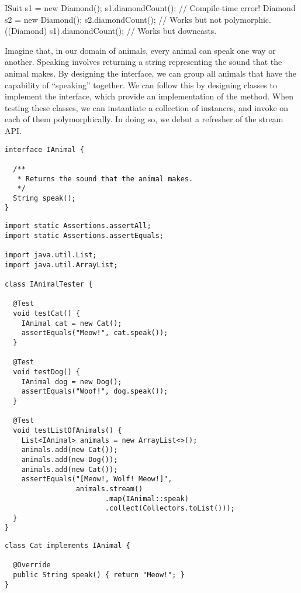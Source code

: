 \begin{verbnobox}[\small]
ISuit s1 = new Diamond();
s1.diamondCount();             // Compile-time error!
Diamond s2 = new Diamond();
s2.diamondCount();             // Works but not polymorphic.
((Diamond) s1).diamondCount(); // Works but downcasts.
\end{verbnobox}

Imagine that, in our domain of animals, every animal can speak one way or another. 
Speaking involves returning a string representing the sound that the animal makes. 
By designing the  interface, we can group all animals that have the capability of ``speaking'' together. 
We can follow this by designing classes to implement the  interface, which provide an implementation of the  method. 
When testing these classes, we can instantiate a collection of  instances, and invoke  on each of them polymorphically. 
In doing so, we debut a refresher of the stream API.

\enlargethispage{-4\baselineskip}
\begin{lstlisting}[language=MyJava]
interface IAnimal {

  /**
   * Returns the sound that the animal makes.
   */
  String speak();
}
\end{lstlisting}

\begin{lstlisting}[language=MyJava]
import static Assertions.assertAll;
import static Assertions.assertEquals;

import java.util.List;
import java.util.ArrayList;

class IAnimalTester {
  
  @Test
  void testCat() {
    IAnimal cat = new Cat();
    assertEquals("Meow!", cat.speak());
  }

  @Test
  void testDog() {
    IAnimal dog = new Dog();
    assertEquals("Woof!", dog.speak());
  }

  @Test
  void testListOfAnimals() {
    List<IAnimal> animals = new ArrayList<>();
    animals.add(new Cat());
    animals.add(new Dog());
    animals.add(new Cat());
    assertEquals("[Meow!, Wolf! Meow!]", 
                 animals.stream()
                        .map(IAnimal::speak)
                        .collect(Collectors.toList()));
  }
}
\end{lstlisting}

\begin{lstlisting}[language=MyJava]
class Cat implements IAnimal {

  @Override
  public String speak() { return "Meow!"; }
}
\end{lstlisting}

